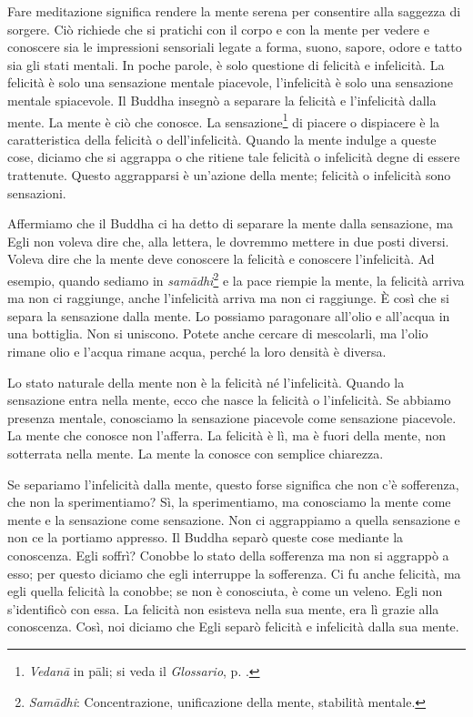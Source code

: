 Fare meditazione significa rendere la mente serena per consentire alla
saggezza di sorgere. Ciò richiede che si pratichi con il corpo e con la
mente per vedere e conoscere sia le impressioni sensoriali legate a
forma, suono, sapore, odore e tatto sia gli stati mentali. In poche
parole, è solo questione di felicità e infelicità. La felicità è solo
una sensazione mentale piacevole, l'infelicità è solo una sensazione
mentale spiacevole. Il Buddha insegnò a separare la felicità e
l'infelicità dalla mente. La mente è ciò che conosce. La
sensazione\footnote{\emph{Vedanā} in pāli; si veda il \emph{Glossario}, p. \pageref{glossary-vedana}.}
di piacere o dispiacere è la caratteristica della felicità o
dell'infelicità. Quando la mente indulge a queste cose, diciamo che si
aggrappa o che ritiene tale felicità o infelicità degne di essere
trattenute. Questo aggrapparsi è un'azione della mente; felicità o
infelicità sono sensazioni.

Affermiamo che il Buddha ci ha detto di separare la mente dalla
sensazione, ma Egli non voleva dire che, alla lettera, le dovremmo
mettere in due posti diversi. Voleva dire che la mente deve conoscere la
felicità e conoscere l'infelicità. Ad esempio, quando sediamo in
\emph{samādhi}\footnote{\emph{Samādhi}: Concentrazione, unificazione
  della mente, stabilità mentale.} e la pace riempie la mente, la
felicità arriva ma non ci raggiunge, anche l'infelicità arriva ma non ci
raggiunge. È così che si separa la sensazione dalla mente. Lo possiamo
paragonare all'olio e all'acqua in una bottiglia. Non si uniscono.
Potete anche cercare di mescolarli, ma l'olio rimane olio e l'acqua
rimane acqua, perché la loro densità è diversa.

Lo stato naturale della mente non è la felicità né l'infelicità. Quando
la sensazione entra nella mente, ecco che nasce la felicità o
l'infelicità. Se abbiamo presenza mentale, conosciamo la sensazione
piacevole come sensazione piacevole. La mente che conosce non l'afferra.
La felicità è lì, ma è fuori della mente, non sotterrata nella mente. La
mente la conosce con semplice chiarezza.

Se separiamo l'infelicità dalla mente, questo forse significa che non
c'è sofferenza, che non la sperimentiamo? Sì, la sperimentiamo, ma
conosciamo la mente come mente e la sensazione come sensazione. Non ci
aggrappiamo a quella sensazione e non ce la portiamo appresso. Il Buddha
separò queste cose mediante la conoscenza. Egli soffrì? Conobbe lo stato
della sofferenza ma non si aggrappò a esso; per questo diciamo che egli
interruppe la sofferenza. Ci fu anche felicità, ma egli quella felicità
la conobbe; se non è conosciuta, è come un veleno. Egli non s'identificò
con essa. La felicità non esisteva nella sua mente, era lì grazie alla
conoscenza. Così, noi diciamo che Egli separò felicità e infelicità
dalla sua mente.

